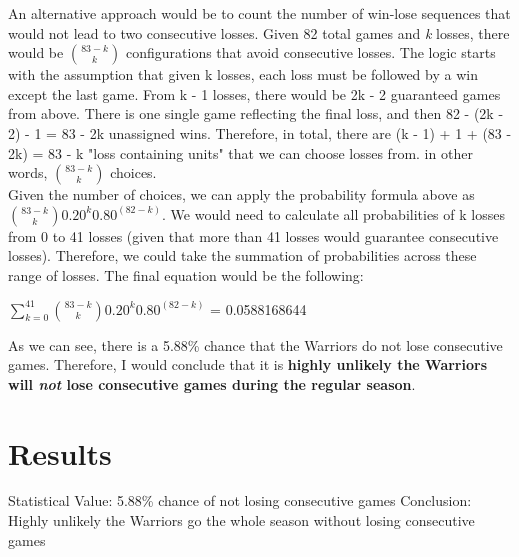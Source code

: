 \documentclass[11pt]{article}
\begin{document}
An alternative approach would be to count the number of win-lose sequences that would not lead to two consecutive losses. Given 82 total games and \textit{k} losses, there would be \({83 - k \choose k}\) configurations that avoid consecutive losses. The logic starts with the assumption that given k losses, each loss must be followed by a win except the last game. From k - 1 losses, there would be 2k - 2 guaranteed games from above. There is one single game reflecting the final loss, and then 82 - (2k - 2) - 1 = 83 - 2k unassigned wins. Therefore, in total, there are (k - 1) + 1 + (83 - 2k) = 83 - k "loss containing units" that we can choose losses from. in other words, \({83 - k \choose k}\) choices. \\

Given the number of choices, we can apply the probability formula above as \({83 - k \choose k} 0.20^k 0.80^{(82 - k)}\). We would need to calculate all probabilities of k losses from 0 to 41 losses (given that more than 41 losses would guarantee consecutive losses). Therefore, we could take the summation of probabilities across these range of losses. The final equation would be the following:

\begin{center}
\(\sum_{k=0}^{41} {83 - k \choose k} 0.20^k 0.80^{(82 - k)}\) = 0.0588168644
\end{center}

As we can see, there is a 5.88\% chance that the Warriors do not lose consecutive games. Therefore, I would conclude that it is \textbf{highly unlikely the Warriors will \textit{not} lose consecutive games during the regular season}.

\section{Results}
Statistical Value: 5.88\% chance of not losing consecutive games
Conclusion: Highly unlikely the Warriors go the whole season without losing consecutive games
\end{document}
